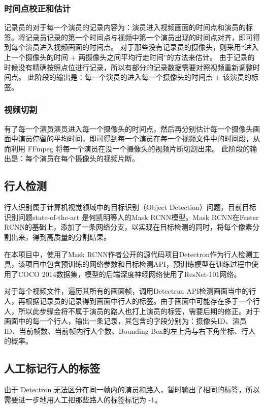 \subsubsection{时间点校正和估计}
记录员的对于每一个演员的记录内容为：演员进入视频画面的时间点和演员的标签。将记录员记录的第一个时间点与视频中第一个演员出现的时间点对齐，即可得到每个演员进入视频画面的时间点。
对于那些没有记录员的摄像头，则采用“进入上一个摄像头的时间 + 两摄像头之间平均行走时间”的方法来估计。
由于记录的时候没有精确按照点位进行记录，所以有部分的记录数据需要对照视频重新调整时间点。
此阶段的输出是：每一个演员的进入每一个摄像头的时间点 + 该演员的标签。

\subsubsection{视频切割}
有了每一个演员演员进入每一个摄像头的时间点，然后再分别估计每一个摄像头画面中演员停留的平均时间，即可得到每一个演员在每一个视频文件中的时间段，从而利用 FFmpeg 将每一个演员在没一个摄像头的视频片断切割出来。
此阶段的输出是：每个演员在每个摄像头的视频片断。

\subsection{行人检测}
行人识别属于计算机视觉领域中的目标识别（Object Detection）问题，目前目标识别问题state-of-the-art 是何凯明等人的Mask RCNN\cite{he2017mask}模型。Mask RCNN在Faster RCNN\cite{ren2015faster}的基础上，添加了一条网络分支，以实现在目标检测的同时，将每个像素分割出来，得到高质量的分割结果。

在本项目中，使用了Mask RCNN作者公开的源代码项目Detectron\cite{Detectron2018}作为行人检测工具，该项目中包含预训练的网络参数和目标检测API，预训练模型在训练过程中使用了COCO 2014\cite{lin2014microsoft}数据集，模型的后端深度神经网络使用了ResNet-101\cite{he2016deep}网络。

对于每个视频文件，遍历其所有的画面帧，调用Detectron API检测画面当中的行人，再根据记录员的记录得到画面中行人的标签。由于画面中可能存在多于一个行人，所以此步骤会将不属于演员的路人也打上演员的标签，需要后期的修正。对于画面中的每一个行人，输出一条记录，其包含的字段分别为：摄像头ID、演员ID、当前帧数、当前帧内行人个数、Bounding Box的左上角与右下角坐标、行人的概率。

\subsection{人工标记行人的标签}

由于 Detectron 无法区分在同一帧内的演员和路人，暂时输出了相同的标签，所以需要进一步地用人工把那些路人的标签标记为 -1。

